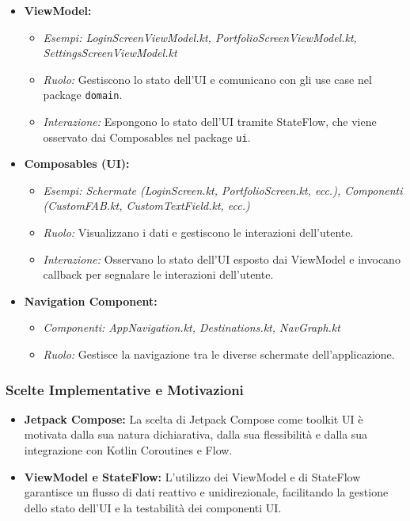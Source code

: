\documentclass{article}
\begin{document}
\begin{itemize}
    \item \textbf{ViewModel:}
    \begin{itemize}
        \item \textit{Esempi: LoginScreenViewModel.kt, PortfolioScreenViewModel.kt, SettingsScreenViewModel.kt}
        \item \textit{Ruolo:} Gestiscono lo stato dell'UI e comunicano con gli use case nel package \texttt{domain}.
        \item \textit{Interazione:} Espongono lo stato dell'UI tramite StateFlow, che viene osservato dai Composables nel package \texttt{ui}.
    \end{itemize}
    \item \textbf{Composables (UI):}
    \begin{itemize}
        \item \textit{Esempi: Schermate (LoginScreen.kt, PortfolioScreen.kt, ecc.), Componenti (CustomFAB.kt, CustomTextField.kt, ecc.)}
        \item \textit{Ruolo:} Visualizzano i dati e gestiscono le interazioni dell'utente.
        \item \textit{Interazione:} Osservano lo stato dell'UI esposto dai ViewModel e invocano callback per segnalare le interazioni dell'utente.
    \end{itemize}
    \item \textbf{Navigation Component:}
    \begin{itemize}
        \item \textit{Componenti: AppNavigation.kt, Destinations.kt, NavGraph.kt}
        \item \textit{Ruolo:} Gestisce la navigazione tra le diverse schermate dell'applicazione.
    \end{itemize}
\end{itemize}

\subsubsection{Scelte Implementative e Motivazioni}

\begin{itemize}
    \item \textbf{Jetpack Compose:} La scelta di Jetpack Compose come toolkit UI è motivata dalla sua natura dichiarativa, dalla sua flessibilità e dalla sua integrazione con Kotlin Coroutines e Flow.
    \item \textbf{ViewModel e StateFlow:} L'utilizzo dei ViewModel e di StateFlow garantisce un flusso di dati reattivo e unidirezionale, facilitando la gestione dello stato dell'UI e la testabilità dei componenti UI.
\end{itemize}
\end{document}
